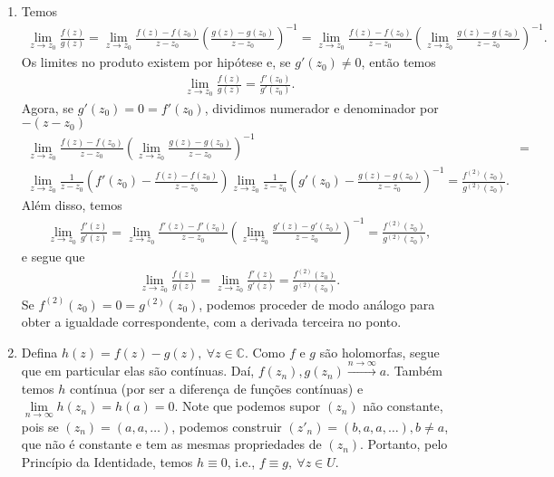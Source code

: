 \documentclass[12pt,a4paper]{article}
\begin{document}
\begin{enumerate}
		\item Temos
		\begin{align*}
		\lim\limits_{z\to z_0}\frac{f(z)}{g(z)} = \lim\limits_{z\to z_0} \frac{f(z) - f(z_0)}{z - z_0}\left( \frac{g(z) - g(z_0)}{z - z_0} \right)^{-1} = \lim\limits_{z\to z_0} \frac{f(z) - f(z_0)}{z - z_0}\left(\lim\limits_{z\to z_0} \frac{g(z) - g(z_0)}{z - z_0} \right)^{-1}.
		\end{align*}
		Os limites no produto existem por hipótese e, se $g'(z_0)\neq 0$, então temos
		\begin{align*}
		\lim\limits_{z\to z_0}\frac{f(z)}{g(z)} = \frac{f'(z_0)}{g'(z_0)}.
		\end{align*}
		Agora, se $g'(z_0) = 0 = f'(z_0)$, dividimos numerador e denominador por $-(z-z_0)$
		\begin{align*}
		\lim\limits_{z\to z_0} \frac{f(z) - f(z_0)}{z - z_0}\left(\lim\limits_{z\to z_0} \frac{g(z) - g(z_0)}{z - z_0} \right)^{-1} &= \\
		\lim\limits_{z\to z_0} \frac{1}{z-z_0}\left(f'(z_0) - \frac{f(z) - f(z_0)}{z - z_0}\right)\lim\limits_{z\to z_0}\frac{1}{z-z_0}\left(g'(z_0) - \frac{g(z) - g(z_0)}{z - z_0} \right)^{-1} = \frac{f^{(2)}(z_0)}{g^{(2)}(z_0)}.
		\end{align*}
		Além disso, temos
		\begin{align*}
		\lim\limits_{z\to z_0}\frac{f'(z)}{g'(z)} = \lim\limits_{z\to z_0} \frac{f'(z) - f'(z_0)}{z - z_0}\left(\lim\limits_{z\to z_0} \frac{g'(z) - g'(z_0)}{z - z_0} \right)^{-1} = \frac{f^{(2)}(z_0)}{g^{(2)}(z_0)},
		\end{align*}
		e segue que
		\begin{align*}
		\lim\limits_{z\to z_0}\frac{f(z)}{g(z)} = \lim\limits_{z\to z_0}\frac{f'(z)}{g'(z)} = \frac{f^{(2)}(z_0)}{g^{(2)}(z_0)}.
		\end{align*}
		Se $f^{(2)}(z_0) = 0 = g^{(2)}(z_0)$, podemos proceder de modo análogo para obter a igualdade correspondente, com a derivada terceira no ponto.
		
		\item Defina $h(z) = f(z) - g(z), \ \forall z\in\mathbb{C}$. Como $f$ e $g$ são holomorfas, segue que em particular elas são contínuas. Daí, $f(z_n), g(z_n) \xrightarrow{n\to\infty} a$. Também temos $h$ contínua (por ser a diferença de funções contínuas) e $\displaystyle{\lim\limits_{n\to\infty} h(z_n) = h(a) = 0}$. Note que podemos supor $(z_n)$ não constante, pois se $(z_n) = (a,a,\dots)$, podemos construir $(z'_n) = (b,a,a,\dots), b\neq a$, que não é constante e tem as mesmas propriedades de $(z_n)$. Portanto, pelo Princípio da Identidade, temos $h\equiv 0$, i.e., $f\equiv g, \ \forall z\in U$.
		
	\end{enumerate}
\end{document}
